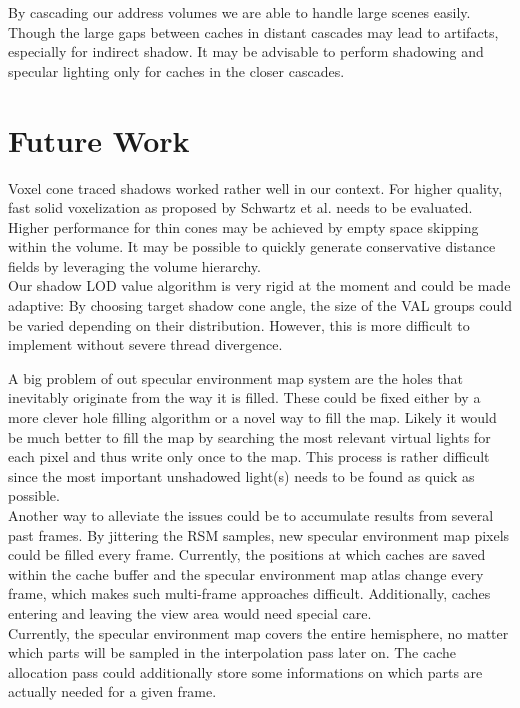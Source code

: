 \documentclass[thesis.tex]{subfiles}
\begin{document}
By cascading our address volumes we are able to handle large scenes easily.
Though the large gaps between caches in distant cascades may lead to artifacts, especially for indirect shadow.
It may be advisable to perform shadowing and specular lighting only for caches in the closer cascades.



\section{Future Work}
Voxel cone traced shadows worked rather well in our context.
For higher quality, fast solid voxelization as proposed by Schwartz et al. \cite{bib:solidvoxelization} needs to be evaluated.
Higher performance for thin cones may be achieved by empty space skipping within the volume.
It may be possible to quickly generate conservative distance fields by leveraging the volume hierarchy.
\\
Our shadow LOD value algorithm is very rigid at the moment and could be made adaptive:
By choosing target shadow cone angle, the size of the VAL groups could be varied depending on their distribution.
However, this is more difficult to implement without severe thread divergence.

A big problem of out specular environment map system are the holes that inevitably originate from the way it is filled.
These could be fixed either by a more clever hole filling algorithm or a novel way to fill the map.
Likely it would be much better to fill the map by searching the most relevant virtual lights for each pixel and thus write only once to the map.
This process is rather difficult since the most important unshadowed light(s) needs to be found as quick as possible.
\\
Another way to alleviate the issues could be to accumulate results from several past frames.
By jittering the RSM samples, new specular environment map pixels could be filled every frame.
Currently, the positions at which caches are saved within the cache buffer and the specular environment map atlas change every frame, which makes such multi-frame approaches difficult.
Additionally, caches entering and leaving the view area would need special care.
\\
Currently, the specular environment map covers the entire hemisphere, no matter which parts will be sampled in the interpolation pass later on.
The cache allocation pass could additionally store some informations on which parts are actually needed for a given frame.
\end{document}
